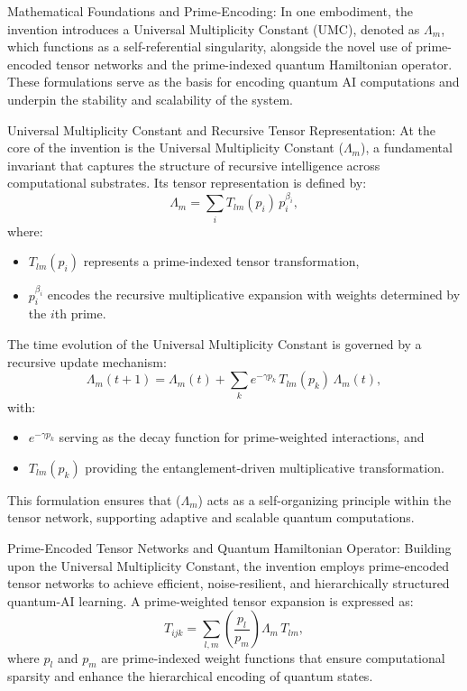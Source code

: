 \pa Mathematical Foundations and Prime-Encoding: In one embodiment, the invention introduces a Universal Multiplicity Constant (UMC), denoted as $\Lambda_m$, which functions as a self-referential singularity, alongside the novel use of prime-encoded tensor networks and the prime-indexed quantum Hamiltonian operator. These formulations serve as the basis for encoding quantum AI computations and underpin the stability and scalability of the system.

\pa Universal Multiplicity Constant and Recursive Tensor Representation:
At the core of the invention is the Universal Multiplicity Constant ($\Lambda_m$), a fundamental invariant that captures the structure of recursive intelligence across computational substrates. Its tensor representation is defined by:
\begin{equation}
\Lambda_m = \sum_{i} T_{lm}(p_i) \, p_i^{\beta_i},
\end{equation}
where:
\begin{itemize}
    \item \(T_{lm}(p_i)\) represents a prime-indexed tensor transformation,
    \item \(p_i^{\beta_i}\) encodes the recursive multiplicative expansion with weights determined by the \(i\)th prime.
\end{itemize}

\pa The time evolution of the Universal Multiplicity Constant is governed by a recursive update mechanism:
\begin{equation}
\Lambda_m(t+1) = \Lambda_m(t) + \sum_{k} e^{-\gamma p_k} \, T_{lm}(p_k) \, \Lambda_m(t),
\end{equation}
with:
\begin{itemize}
    \item \(e^{-\gamma p_k}\) serving as the decay function for prime-weighted interactions, and
    \item \(T_{lm}(p_k)\) providing the entanglement-driven multiplicative transformation.
\end{itemize}
This formulation ensures that ($\Lambda_m$) acts as a self-organizing principle within the tensor network, supporting adaptive and scalable quantum computations.

\pa Prime-Encoded Tensor Networks and Quantum Hamiltonian Operator: Building upon the Universal Multiplicity Constant, the invention employs prime-encoded tensor networks to achieve efficient, noise-resilient, and hierarchically structured quantum-AI learning. A prime-weighted tensor expansion is expressed as:
\begin{equation}
T_{ijk} = \sum_{l,m} \left( \frac{p_l}{p_m} \right) \Lambda_m \, T_{lm},
\end{equation}
where \(p_l\) and \(p_m\) are prime-indexed weight functions that ensure computational sparsity and enhance the hierarchical encoding of quantum states.

